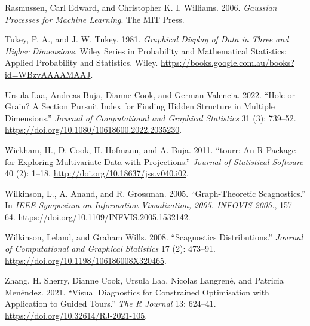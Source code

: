 \documentclass[
  12pt,
]{interact}
\newlength{\cslhangindent}
\newenvironment{CSLReferences}[2] %
 {\begin{list}{}{%
  \setlength{\itemindent}{0pt}
  \setlength{\leftmargin}{0pt}
  \setlength{\parsep}{0pt}
  \ifodd #1
   \setlength{\leftmargin}{\cslhangindent}
   \setlength{\itemindent}{-1\cslhangindent}
  \fi
  \setlength{\itemsep}{#2\baselineskip}}}
 {\end{list}}
\theoremstyle{plain}
\begin{document}
\begin{CSLReferences}{1}{0}
Rasmussen, Carl Edward, and Christopher K. I. Williams. 2006.
\emph{Gaussian Processes for Machine Learning}. The MIT Press.

Tukey, P. A., and J. W. Tukey. 1981. \emph{Graphical Display of Data in
Three and Higher Dimensions}. Wiley Series in Probability and
Mathematical Statistics: Applied Probability and Statistics. Wiley.
\url{https://books.google.com.au/books?id=WBzvAAAAMAAJ}.

Ursula Laa, Andreas Buja, Dianne Cook, and German Valencia. 2022.
{``Hole or Grain? A Section Pursuit Index for Finding Hidden Structure
in Multiple Dimensions.''} \emph{Journal of Computational and Graphical
Statistics} 31 (3): 739--52.
\url{https://doi.org/10.1080/10618600.2022.2035230}.

Wickham, H., D. Cook, H. Hofmann, and A. Buja. 2011. {``{tourr}: An {R}
Package for Exploring Multivariate Data with Projections.''}
\emph{Journal of Statistical Software} 40 (2): 1--18.
\url{http://doi.org/10.18637/jss.v040.i02}.

Wilkinson, L., A. Anand, and R. Grossman. 2005. {``Graph-Theoretic
Scagnostics.''} In \emph{IEEE Symposium on Information Visualization,
2005. INFOVIS 2005.}, 157--64.
\url{https://doi.org/10.1109/INFVIS.2005.1532142}.

Wilkinson, Leland, and Graham Wills. 2008. {``Scagnostics
Distributions.''} \emph{Journal of Computational and Graphical
Statistics} 17 (2): 473--91.
\url{https://doi.org/10.1198/106186008X320465}.

Zhang, H. Sherry, Dianne Cook, Ursula Laa, Nicolas Langrené, and
Patricia Menéndez. 2021. {``Visual Diagnostics for Constrained
Optimisation with Application to Guided Tours.''} \emph{The R Journal}
13: 624--41. \url{https://doi.org/10.32614/RJ-2021-105}.

\end{CSLReferences}
\end{document}

